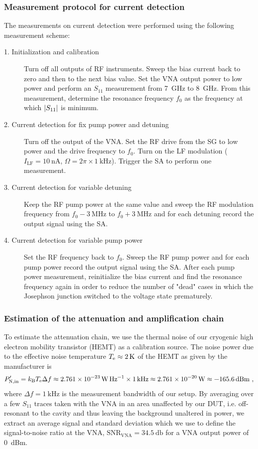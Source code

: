 \subsubsection{Measurement protocol for current detection}
% 
The measurements on current detection were performed using the following measurement scheme:
% 
\begin{description}
	\item[1. Initialization and calibration] Turn off all outputs of RF instruments.
	Sweep the bias current back to zero and then to the next bias value.
	Set the VNA output power to low power and perform an $S_{11}$ measurement from \SI{7}{GHz} to \SI{8}{GHz}.
	From this measurement, determine the resonance frequency $f_0$ as the frequency at which $\lvert S_{11}\rvert$ is minimum.
	\item[2. Current detection for fix pump power and detuning] Turn off the output of the VNA.
	Set the RF drive from the SG to low power and the drive frequency to $f_0$.
	Turn on the LF modulation ($I_\text{LF}=\SI{10}{\nano\ampere}$, $\Omega=2\pi\times\SI{1}{\kilo\hertz}$).
	Trigger the SA to perform one measurement.
	\item[3. Current detection for variable detuning] Keep the RF pump power at the same value and sweep the RF modulation frequency from $f_0-\SI{3}{\mega\hertz}$ to $f_0+\SI{3}{\mega\hertz}$ and for each detuning record the output signal using the SA.
	\item[4. Current detection for variable pump power] Set the RF frequency back to $f_0$.
	Sweep the RF pump power and for each pump power record the output signal using the SA.
	After each pump power measurement, reinitialize the bias current and find the resonance frequency again in order to reduce the number of "dead" cases in which the Josephson junction switched to the voltage state prematurely.
\end{description}

\subsubsection{Estimation of the attenuation and amplification chain}\label{sec:attenuation}

To estimate the attenuation chain, we use the thermal noise of our cryogenic high electron mobility transistor (HEMT) as a calibration source.
% 
The noise power due to the effective noise temperature $T_{\rm e}\approx2{\,\rm K}$ of the HEMT as given by the manufacturer is
% 
\begin{align}
P_{\rm N,in}'=k_{\rm B}T_{\rm e}\Delta f \approx \SI{2.761e-23}{\watt\per\hertz} \times \SI{1}{\kilo\hertz} \approx \SI{2.761e-20}{\watt} \approx \SI{-165.6}{dBm}\ ,
\label{eq:HEMTnoise}
\end{align}
% 
where $\Delta f=\SI{1}{\kilo\hertz}$ is the measurement bandwidth of our setup.
% 
By averaging over a few $S_{11}$ traces taken with the VNA in an area unaffected by our DUT, i.e. off-resonant to the cavity and thus leaving the background unaltered in power, we extract an average signal and standard deviation which we use to define the signal-to-noise ratio at the VNA, $\text{SNR}_\text{VNA}=\SI{34.5}{\decibel}$ for a VNA output power of \SI{0}{dBm}.

